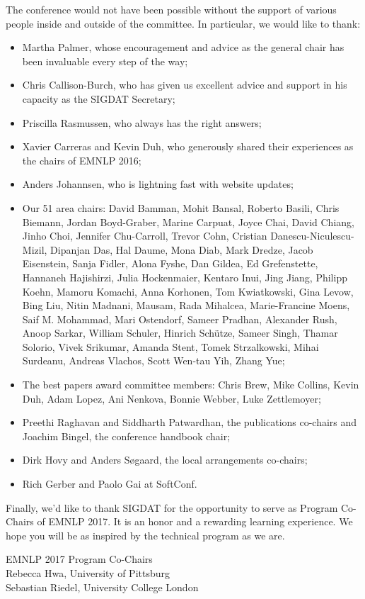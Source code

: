 \documentclass[11pt]{article}
\begin{document}
The conference would not have been possible without the support of various people inside and outside of the committee. In particular, we would like to thank:

\begin{itemize}
 
\item Martha Palmer, whose encouragement and advice as the general chair has been invaluable every step of the way;
\item Chris Callison-Burch, who has given us excellent advice and support in his capacity as the SIGDAT Secretary;
\item Priscilla Rasmussen, who always has the right answers;
\item Xavier Carreras and Kevin Duh, who generously shared their experiences as the chairs of EMNLP 2016; 
\item Anders Johannsen, who is lightning fast with website updates;
\item Our 51 area chairs:  David Bamman, Mohit Bansal, Roberto Basili, Chris Biemann, Jordan Boyd-Graber, Marine Carpuat, Joyce Chai, David Chiang, Jinho Choi, Jennifer Chu-Carroll, Trevor Cohn, Cristian Danescu-Niculescu-Mizil, Dipanjan Das, Hal Daume, Mona Diab, Mark Dredze, Jacob Eisenstein, Sanja Fidler, Alona Fyshe, Dan Gildea, Ed Grefenstette, Hannaneh Hajishirzi, Julia Hockenmaier, Kentaro Inui, Jing Jiang, Philipp Koehn, Mamoru Komachi, Anna Korhonen, Tom Kwiatkowski, Gina Levow, Bing Liu, Nitin Madnani, Mausam, Rada Mihalcea, Marie-Francine Moens, Saif M. Mohammad, Mari Ostendorf, Sameer Pradhan, Alexander Rush, Anoop Sarkar, William Schuler, Hinrich Schütze, Sameer Singh, Thamar Solorio, Vivek Srikumar, Amanda Stent, Tomek Strzalkowski, Mihai Surdeanu, Andreas Vlachos, Scott Wen-tau Yih, Zhang Yue;
\item The best papers award committee members: Chris Brew, Mike Collins, Kevin Duh, Adam Lopez, Ani Nenkova, Bonnie Webber, Luke Zettlemoyer;
\item Preethi Raghavan and Siddharth Patwardhan, the publications co-chairs and Joachim Bingel, the conference handbook chair;
\item Dirk Hovy and Anders Søgaard, the local arrangements co-chairs;
\item Rich Gerber and Paolo Gai at SoftConf.
 
\end{itemize}
Finally, we’d like to thank SIGDAT for the opportunity to serve as Program Co-Chairs of EMNLP 2017. It is an honor and a rewarding learning experience. We hope you will be as inspired by the technical program as we are. 

\vspace{2em}

\noindent EMNLP 2017 Program Co-Chairs \\
Rebecca Hwa, University of Pittsburg\\
Sebastian Riedel, University College London
\end{document}
